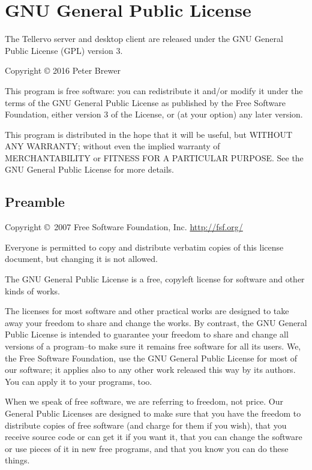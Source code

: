
\chapter{GNU General Public License}
\label{txt:licenseStart}
The Tellervo server and desktop client are released under the GNU General Public License (GPL) version 3.

Copyright {\copyright} 2016 Peter Brewer

This program is free software: you can redistribute it and/or modify
it under the terms of the GNU General Public License as published by
the Free Software Foundation, either version 3 of the License, or
(at your option) any later version.

This program is distributed in the hope that it will be useful,
but WITHOUT ANY WARRANTY; without even the implied warranty of
MERCHANTABILITY or FITNESS FOR A PARTICULAR PURPOSE.  See the
GNU General Public License for more details.

\section{Preamble}
\scriptsize

Copyright \copyright\  2007 Free Software Foundation, Inc. \url{http://fsf.org/}

Everyone is permitted to copy and distribute verbatim copies of this license document, but changing it is not allowed.

The GNU General Public License is a free, copyleft license for
software and other kinds of works.

The licenses for most software and other practical works are designed
to take away your freedom to share and change the works.  By contrast,
the GNU General Public License is intended to guarantee your freedom to
share and change all versions of a program--to make sure it remains free
software for all its users.  We, the Free Software Foundation, use the
GNU General Public License for most of our software; it applies also to
any other work released this way by its authors.  You can apply it to
your programs, too.

When we speak of free software, we are referring to freedom, not
price.  Our General Public Licenses are designed to make sure that you
have the freedom to distribute copies of free software (and charge for
them if you wish), that you receive source code or can get it if you
want it, that you can change the software or use pieces of it in new
free programs, and that you know you can do these things.

